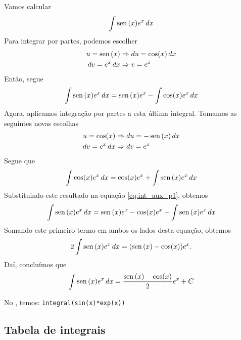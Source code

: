 \cleardoublepage\documentclass[../main.tex]{subfiles}
\begin{document}
\begin{ex}
  Vamos calcular
  \begin{equation*}
    \int \operatorname{sen}\,(x)e^x\,dx
  \end{equation*}
  Para integrar por partes, podemos escolher
  \begin{align*}
    u = \operatorname{sen}\,(x) &\Rightarrow du = \cos(x)\,dx \\
    dv = e^x\,dx &\Rightarrow v = e^x
  \end{align*}
  Então, segue
  \begin{equation*}\label{eq:int_aux_p1}
    \int\operatorname{sen}\,(x)e^x\,dx = \operatorname{sen}\,(x)e^x - \int\cos(x)e^x\,dx
  \end{equation*}
  Agora, aplicamos integração por partes a esta última integral. Tomamos as seguintes novas escolhas
  \begin{align*}
    u = \cos(x) &\Rightarrow du = -\operatorname{sen}\,(x)\,dx \\
    dv = e^x\,dx &\Rightarrow dv = e^x
  \end{align*}
  Segue que
  \begin{equation*}
    \int\cos(x)e^x\,dx = \cos(x)e^x + \int\operatorname{sen}\,(x)e^x\,dx
  \end{equation*}
  Substituindo este resultado na equação \eqref{eq:int_aux_p1}, obtemos
  \begin{equation*}
    \int\operatorname{sen}\,(x)e^x\,dx = \operatorname{sen}\,(x)e^x-\cos(x)e^x-\int\operatorname{sen}\,(x)e^x\,dx
  \end{equation*}
  Somando este primeiro termo em ambos os lados desta equação, obtemos
  \begin{equation*}
    2\int\operatorname{sen}\,(x)e^x\,dx = (\operatorname{sen}\,(x)-\cos(x))e^x.
  \end{equation*}
  Daí, concluímos que
  \begin{equation*}
    \int\operatorname{sen}\,(x)e^x\,dx = \frac{\operatorname{sen}\,(x)-\cos(x)}{2}e^x + C
  \end{equation*}

    No \geogebra, temos: \verb|integral(sin(x)*exp(x))|
\end{ex}
\subsection*{Tabela de integrais}
\end{document}
